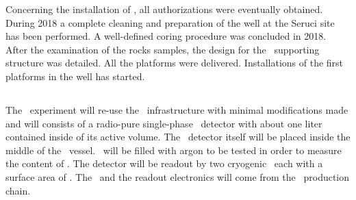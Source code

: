 
Concerning the installation of \SeruciOne, all  authorizations were eventually obtained.  During  2018 a complete cleaning and preparation of the well at the Seruci site has been performed.  A well-defined coring procedure was concluded in 2018. After the examination of the rocks samples, the design for the \SeruciOne\ supporting structure was detailed. All the platforms were delivered. Installations of the first platforms in the well has started.



\subsection{\DArT} 
The \DArT\ experiment will re-use the \ArDM\ infrastructure with minimal modifications made and will consists of a radio-pure single-phase \LAr\ detector with about one liter contained inside of its active volume.  The \DArT\ detector itself will be placed inside the middle of the \ArDM\ vessel.  \DArT\ will be filled with argon to be tested in order to measure the content of .  The detector will be readout by two cryogenic \SiPMs\ each with a surface area of \DSkSiPMAreaMaxcm.  The \SiPMs\ and the readout electronics will come from the \DSks\ production chain. 

